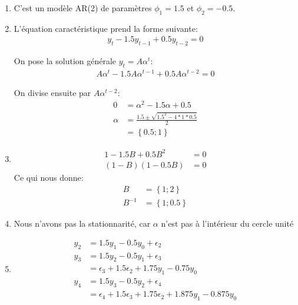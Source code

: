 \documentclass{article}
\begin{document}
\begin{enumerate}
\item C'est un modèle AR(2) de paramètres $\phi_1=1.5$ et $\phi_2=-0.5$.
\item L'équation caractéristique prend la forme suivante:
  \begin{align*}
    y_t - 1.5 y_{t-1} + 0.5y_{t-2} = 0
  \end{align*}
  
  On pose la solution générale $y_t=A\alpha^t$:
  \begin{align*}
    A\alpha^t - 1.5 A\alpha^{t-1} + 0.5A\alpha^{t-2} = 0
  \end{align*}
  
  On divise ensuite par $A\alpha^{t-2}$:
  \begin{align*}
    0 &= \alpha^2 - 1.5 \alpha + 0.5\\
    \alpha &= \frac{1.5 \pm \sqrt{1.5^2-4*1*0.5}}{2} \\
    &= \left\{0.5 ; 1 \right\}
  \end{align*}

\item
  \begin{align*}
    1 - 1.5B + 0.5B^2 &= 0 \\
    (1-B)(1-0.5B) &= 0
  \end{align*}
  Ce qui nous donne:
  \begin{align*}
    B &= \left\{ 1;2 \right\} \\
    B^{-1} &= \left\{ 1;0.5 \right\}
  \end{align*}

\item Nous n'avons pas la stationnarité, car $\alpha$ n'est pas à l'intérieur du cercle unité

\item
  \begin{align*}
    y_2 &= 1.5 y_1 - 0.5y_0 + \epsilon_2 \\
    y_3 &= 1.5 y_2 - 0.5y_1 + \epsilon_3 \\
    &= \epsilon_3 + 1.5 \epsilon_2 + 1.75y_1 - 0.75 y_0 \\
    y_4 &= 1.5 y_3 - 0.5y_2 + \epsilon_4 \\
    &= \epsilon_4 + 1.5 \epsilon_3 + 1.75 \epsilon_2 + 1.875 y_1 - 0.875 y_0
  \end{align*}
  

\end{enumerate}
\end{document}
